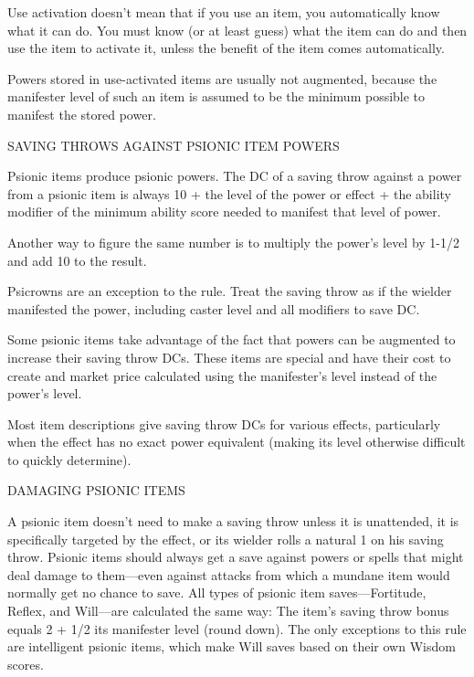 \documentclass{article}
\begin{document}
Use activation doesn't mean that if you use an item, you automatically know what 
it can do. You must know (or at least guess) what the item can do and then use 
the item to activate it, unless the benefit of the item comes automatically.

Powers stored in use-activated items are usually not augmented, because the manifester 
level of such an item is assumed to be the minimum possible to manifest the stored 
power.

\vspace{12pt}
SAVING THROWS AGAINST PSIONIC ITEM POWERS

Psionic items produce psionic powers. The DC of a saving throw against a power 
from a psionic item is always 10 + the level of the power or effect + the ability 
modifier of the minimum ability score needed to manifest that level of power.

Another way to figure the same number is to multiply the power's level by 1-1/2 
and add 10 to the result.

Psicrowns are an exception to the rule. Treat the saving throw as if the wielder 
manifested the power, including caster level and all modifiers to save DC.

Some psionic items take advantage of the fact that powers can be augmented to increase 
their saving throw DCs. These items are special and have their cost to create and 
market price calculated using the manifester's level instead of the power's level.

Most item descriptions give saving throw DCs for various effects, particularly 
when the effect has no exact power equivalent (making its level otherwise difficult 
to quickly determine).

\vspace{12pt}
DAMAGING PSIONIC ITEMS

A psionic item doesn't need to make a saving throw unless it is unattended, it 
is specifically targeted by the effect, or its wielder rolls a natural 1 on his 
saving throw. Psionic items should always get a save against powers or spells that 
might deal damage to them---even against attacks from which a mundane item would 
normally get no chance to save. All types of psionic item saves---Fortitude, Reflex, 
and Will---are calculated the same way: The item's saving throw bonus equals 2 
+ 1/2 its manifester level (round down). The only exceptions to this rule are intelligent 
psionic items, which make Will saves based on their own Wisdom scores.
\end{document}
